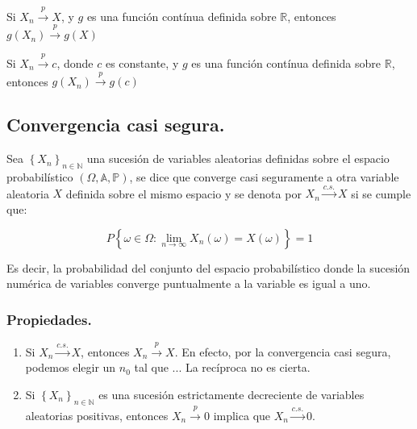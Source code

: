 \begin{teorema}
Si $X_{n} \overset{p}{\to} X $, y $g$ es una funci\'on cont\'inua definida sobre $\mathbb{R}$, entonces $g(X_{n}) \overset{p}{\to} g(X) $
\end{teorema}

\begin{corolario}
Si $X_{n} \overset{p}{\to} c $, donde $c$ es constante, y $g$ es una funci\'on cont\'inua definida sobre $\mathbb{R}$, entonces $g(X_{n}) \overset{p}{\to} g(c) $
\end{corolario}

\subsection{Convergencia casi segura.}
\begin{definicion}
Sea $ \left\{X_n\right\}_{n\in\mathbb{N}} $ una sucesi\'on de variables aleatorias definidas sobre el espacio probabil\'istico $\left(\Omega,\mathbb{A}, \mathbb{P}\right) $, se dice que converge casi seguramente a otra variable aleatoria $X$ definida sobre el mismo espacio y se denota por $X_{n} \overset{c.s.}{\to} X $ si se cumple que:

\begin{equation}
P\left\{ \omega\in\Omega:\lim_{n\to\infty}X_{n}(\omega)=X(\omega)\right\}=1
\end{equation}

\end{definicion}

Es decir, la probabilidad del conjunto del espacio probabil\'istico donde la sucesi\'on num\'erica de variables converge puntualmente a la variable es igual a uno.

\subsubsection{Propiedades.}
\begin{enumerate}
\item Si $X_{n} \overset{c.s.}{\to} X $, entonces $X_{n} \overset{p}{\to} X $. En efecto, por la convergencia casi segura, podemos elegir un $n_0$ tal que ... La rec\'iproca no es cierta.
\item Si  $ \left\{X_n\right\}_{n\in\mathbb{N}} $ es una sucesi\'on estrictamente decreciente de variables aleatorias positivas, entonces $X_{n} \overset{p}{\to} 0$ implica que $X_{n} \overset{c.s.}{\to} 0 $.
\end{enumerate}

